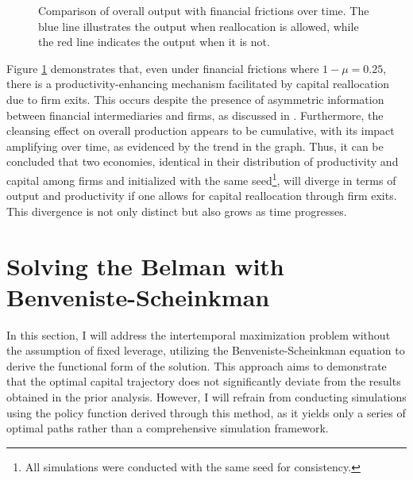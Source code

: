 \documentclass[12pt]{article}
\begin{document}
\begin{figure}[H]
    \centering
    \caption{Comparison of overall output with financial frictions over time. The blue line illustrates the output when
    reallocation  
    is allowed, while the red line indicates the output when it is not.}
    \label{fig:output_comparison_frictions}
\end{figure}
Figure \ref{fig:output_comparison_frictions} demonstrates that, even under financial frictions where \(1- \mu =0.25\),
there is a productivity-enhancing mechanism facilitated by capital reallocation due to firm exits. This occurs despite
the presence of asymmetric information between financial intermediaries and firms, as discussed in \cite{OsePap17}.
Furthermore, the cleansing effect on overall production appears to be cumulative, with its impact amplifying over time,
as evidenced by the trend in the graph. Thus, it can be concluded that two economies, identical in their distribution of
productivity and capital among firms and initialized with the same seed\footnote{All simulations were conducted with the
same seed for consistency.}, will diverge in terms of output and productivity if one allows for capital reallocation
through firm exits. This divergence is not only distinct but also grows as time progresses. 

\section{Solving the Belman with Benveniste-Scheinkman}
In this section, I will address the intertemporal maximization problem without the assumption of fixed leverage,
utilizing the Benveniste-Scheinkman equation to derive the functional form of the solution. This approach aims to
demonstrate that the optimal capital trajectory does not significantly deviate from the results obtained in the prior
analysis. However, I will refrain from conducting simulations using the policy function derived through this method, as
it yields only a series of optimal paths rather than a comprehensive simulation framework. 
\end{document}
